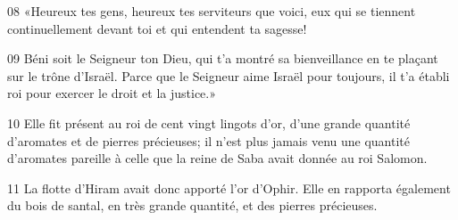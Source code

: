 
08 «Heureux tes gens, heureux tes serviteurs que voici, eux qui se tiennent continuellement devant toi et qui entendent ta sagesse!

09 Béni soit le Seigneur ton Dieu, qui t’a montré sa bienveillance en te plaçant sur le trône d’Israël. Parce que le Seigneur aime Israël pour toujours, il t’a établi roi pour exercer le droit et la justice.»

10 Elle fit présent au roi de cent vingt lingots d’or, d’une grande quantité d’aromates et de pierres précieuses; il n’est plus jamais venu une quantité d’aromates pareille à celle que la reine de Saba avait donnée au roi Salomon.

11 La flotte d’Hiram avait donc apporté l’or d’Ophir. Elle en rapporta également du bois de santal, en très grande quantité, et des pierres précieuses.